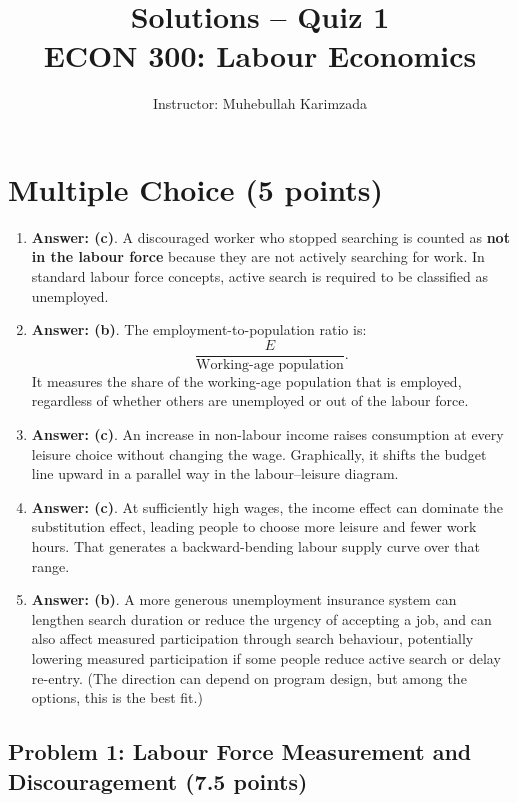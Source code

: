 \documentclass[11pt]{article}
\title{\textbf{Solutions -- Quiz 1} \vspace{ 0.4cm }\\ECON 300: Labour Economics}
\author{Instructor: Muhebullah Karimzada}
\begin{document}
\maketitle

\section*{Multiple Choice (5 points)}


\begin{enumerate}
\item \textbf{Answer: (c)}. A discouraged worker who stopped searching is counted as \textbf{not in the labour force} because they are not actively searching for work. In standard labour force concepts, active search is required to be classified as unemployed.

\item \textbf{Answer: (b)}. The employment-to-population ratio is:
\[
\frac{E}{\text{Working-age population}}.
\]
It measures the share of the working-age population that is employed, regardless of whether others are unemployed or out of the labour force.

\item \textbf{Answer: (c)}. An increase in non-labour income raises consumption at every leisure choice without changing the wage. Graphically, it shifts the budget line upward in a parallel way in the labour--leisure diagram.

\item \textbf{Answer: (c)}. At sufficiently high wages, the income effect can dominate the substitution effect, leading people to choose more leisure and fewer work hours. That generates a backward-bending labour supply curve over that range.

\item \textbf{Answer: (b)}. A more generous unemployment insurance system can lengthen search duration or reduce the urgency of accepting a job, and can also affect measured participation through search behaviour, potentially lowering measured participation if some people reduce active search or delay re-entry. (The direction can depend on program design, but among the options, this is the best fit.)
\end{enumerate}

\newpage

\subsection*{Problem 1: Labour Force Measurement and Discouragement (7.5 points)}
\end{document}
